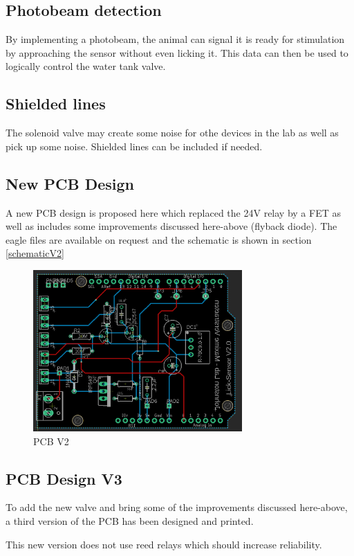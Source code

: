 \documentclass[a4paper]{article}
\begin{document}
\subsection{Photobeam detection}
By implementing a photobeam, the animal can signal it is ready for stimulation by approaching the sensor without even licking it. This data can then be used to logically control the water tank valve.

\subsection{Shielded lines}
The solenoid valve may create some noise for othe devices in the lab as well as pick up some noise. Shielded lines can be included if needed.

\subsection{New PCB Design}
\label{newPCB}
A new PCB design is proposed here which replaced the 24V relay by a FET as well as includes some improvements discussed here-above (flyback diode).
The eagle files are available on request and the schematic is shown in section \ref{schematicV2}

\begin{figure}[h!t!b!]
    \centering
    \includegraphics[width = 8cm]{images/schematicV2.PNG}
    \caption{PCB V2}
    \label{fig:PCBV2}
\end{figure}

\subsection{PCB Design V3}
\label{designV3}
To add the new valve and bring some of the improvements discussed here-above, a third version of the PCB has been designed and printed.

This new version does not use reed relays which should increase reliability.
\end{document}
